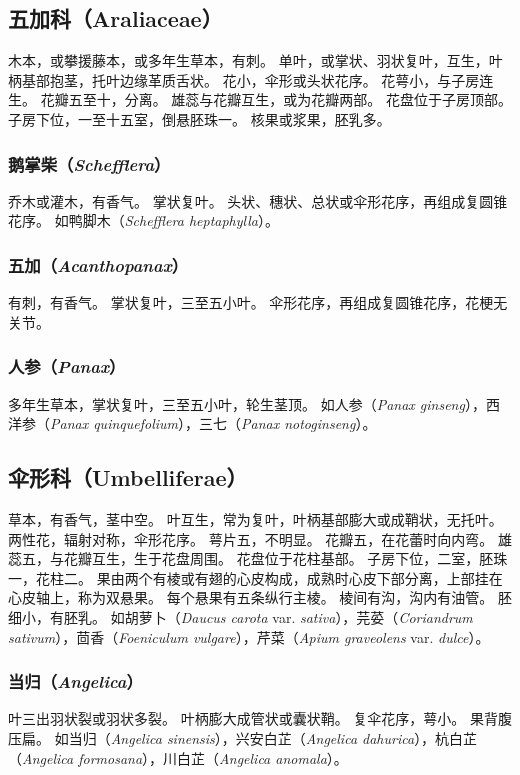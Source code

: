 \documentclass[11pt]{article}
\begin{document}
\begin{sloppypar}
\subsection{五加科（Araliaceae）}
木本，或攀援藤本，或多年生草本，有刺。
单叶，或掌状、羽状复叶，互生，叶柄基部抱茎，托叶边缘革质舌状。
花小，伞形或头状花序。
花萼小，与子房连生。
花瓣五至十，分离。
雄蕊与花瓣互生，或为花瓣两部。
花盘位于子房顶部。
子房下位，一至十五室，倒悬胚珠一。
核果或浆果，胚乳多。

\subsubsection{鹅掌柴（\textit{Schefflera}）}
乔木或灌木，有香气。
掌状复叶。
头状、穗状、总状或伞形花序，再组成复圆锥花序。
如鸭脚木（\textit{Schefflera heptaphylla}）。

\subsubsection{五加（\textit{Acanthopanax}）}
有刺，有香气。
掌状复叶，三至五小叶。
伞形花序，再组成复圆锥花序，花梗无关节。

\subsubsection{人参（\textit{Panax}）}
多年生草本，掌状复叶，三至五小叶，轮生茎顶。
如人参（\textit{Panax ginseng}），西洋参（\textit{Panax quinquefolium}），三七（\textit{Panax notoginseng}）。

\subsection{伞形科（Umbelliferae）}
草本，有香气，茎中空。
叶互生，常为复叶，叶柄基部膨大或成鞘状，无托叶。
两性花，辐射对称，伞形花序。
萼片五，不明显。
花瓣五，在花蕾时向内弯。
雄蕊五，与花瓣互生，生于花盘周围。
花盘位于花柱基部。
子房下位，二室，胚珠一，花柱二。
果由两个有棱或有翅的心皮构成，成熟时心皮下部分离，上部挂在心皮轴上，称为双悬果。
每个悬果有五条纵行主棱。
棱间有沟，沟内有油管。
胚细小，有胚乳。
如胡萝卜（\textit{Daucus carota} var. \textit{sativa}），芫荽（\textit{Coriandrum sativum}），茴香（\textit{Foeniculum vulgare}），芹菜（\textit{Apium graveolens} var. \textit{dulce}）。

\subsubsection{当归（\textit{Angelica}）}
叶三出羽状裂或羽状多裂。
叶柄膨大成管状或囊状鞘。
复伞花序，萼小。
果背腹压扁。
如当归（\textit{Angelica sinensis}），兴安白芷（\textit{Angelica dahurica}），杭白芷（\textit{Angelica formosana}），川白芷（\textit{Angelica anomala}）。


\end{sloppypar}
\end{document}
